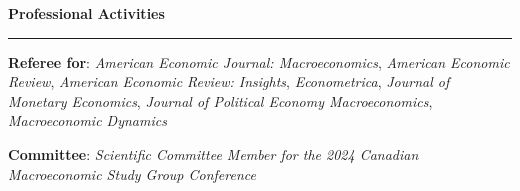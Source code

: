 \documentclass[12pt]{article}
\begin{document}
\vspace{0.5cm}

{\large \textbf{Professional Activities}} \\
\noindent\rule[0.5\baselineskip]{\textwidth}{1pt}

{\small \textbf{Referee for}: \textit{American Economic Journal: Macroeconomics}, \textit{American Economic Review}, \textit{American Economic Review: Insights}, \textit{Econometrica}, \textit{Journal of Monetary Economics}, \textit{Journal of Political Economy Macroeconomics}, \textit{Macroeconomic Dynamics}}

{\small \textbf{Committee}: \textit{Scientific Committee Member for the 2024 Canadian Macroeconomic Study Group Conference}}
\end{document}
